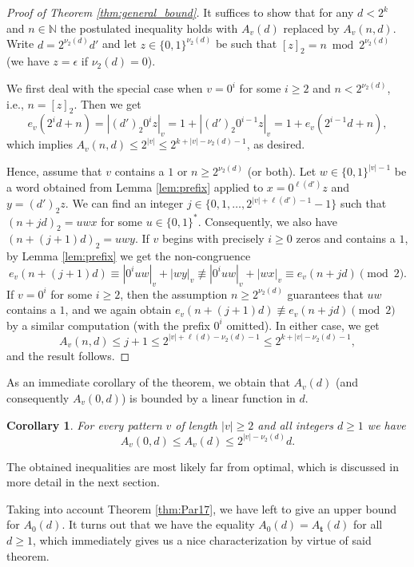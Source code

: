 \documentclass[a4paper,11pt]{amsart}
\newtheorem{cor}[thm]{Corollary}
\theoremstyle{definition}
\newcommand{\N}{\mathbb{N}}
\begin{document}
\begin{proof}[Proof of Theorem \ref{thm:general_bound}]
It suffices to show that for any $d < 2^k$ and $n \in \N$ the postulated inequality holds with $A_v(d)$ replaced by $A_v(n,d)$. Write $d = 2^{\nu_2(d)} d'$ and let $z \in \{0,1\}^{\nu_2(d)}$ be such that $[z]_2 = n \bmod{2^{\nu_2(d)}}$ (we have $z = \epsilon$ if $\nu_2(d)=0$).

 We first deal with the special case when $v = 0^i$ for some $i \geq 2$ and $n < 2^{\nu_2(d)}$, i.e., $n=[z]_2$. Then we get
$$e_v(2^{i}d + n) = |(d')_2 0^i z|_v = 1+ |(d')_2 0^{i-1} z|_v = 1+ e_v(2^{i-1}d + n),   $$
which implies $A_v(n,d) \leq 2^{|v|}\leq 2^{k+ |v| - \nu_2(d)-1}$, as desired.
 
Hence, assume that $v$ contains a $1$ or $n \geq 2^{\nu_2(d)}$ (or both). Let $w \in \{0,1\}^{|v|-1}$ be a word obtained from Lemma \ref{lem:prefix} applied to $x = 0^{\ell(d')} z$ and $y = (d')_2 z$. We can find an integer $j \in \{0,1,\ldots, 2^{|v|+\ell(d')-1} - 1 \}$ such that $(n+jd)_2 = uwx$ for some $u \in \{0,1\}^*$. Consequently, we also have $(n+(j+1)d)_2 = uwy$. If $v$ begins with precisely $i \geq 0$ zeros and contains a $1$, by Lemma \ref{lem:prefix} we get the non-congruence
$$ e_{v}(n+(j+1)d) \equiv |0^i u w|_{v} + |wy|_v \not\equiv |0^i uw|_{v} + |wx|_v \equiv  e_{v}(n+jd) \pmod{2}.   $$
If $v=0^i$ for some $i \geq 2$, then the assumption $n \geq 2^{\nu_2(d)}$ guarantees that $uw$ contains a $1$, and we again obtain $e_{v}(n+(j+1)d)  \not \equiv e_{v}(n+jd) \pmod{2}$ by a similar computation (with the prefix $0^i$ omitted).
In either case, we get
$$A_v(n,d) \leq j + 1 \leq 2^{|v| +  \ell(d) - \nu_2(d)-1} \leq 2^{k+ |v| - \nu_2(d)-1},$$
and the result follows.
\end{proof}

As an immediate corollary of the theorem, we obtain that $A_v(d)$ (and consequently $A_v(0,d)$) is bounded by a linear function in $d$.


\begin{cor} \label{cor:general_bound}
For every pattern $v$ of length $|v| \geq 2$ and all integers $d \geq 1$ we have
$$ A_v(0,d) \leq  A_v(d) \leq 2^{|v|-\nu_2(d)} d.  $$
\end{cor}

The obtained inequalities are most likely far from optimal, which is discussed in more detail in the next section. 

Taking into account Theorem \ref{thm:Par17}, we have left to give an upper bound for $A_0(d)$. It turns out that we have the equality $A_{0}(d) = A_{\mathbf{t}}(d)$ for all $d \geq 1$, which immediately gives us a nice characterization by virtue of said theorem.
\end{document}
